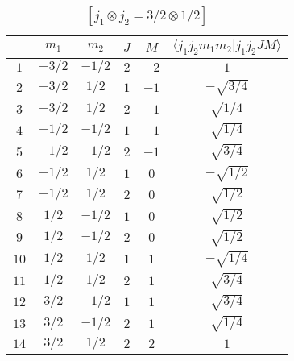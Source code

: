 \begin{table}
\tiny
\caption{$[j_1 \otimes j_2 = 3/2 \otimes 1/2]$}
\begin{center}
\begin{tabular}{|c|c|c|c|c|c|}
\hline 
   & $m_1$ & $m_2$ & $J$ & $M$ & $\langle j_1 j_2 m_1 m_2 | j_1 j_2 J M \rangle$ \\ 
\hline 
$1$ & $-3/2$ & $-1/2$ & $2$ & $-2$ & $1$ \\ 
$2$ & $-3/2$ & $1/2$ & $1$ & $-1$ & $-\sqrt{3/4}$ \\ 
$3$ & $-3/2$ & $1/2$ & $2$ & $-1$ & $\sqrt{1/4}$ \\ 
$4$ & $-1/2$ & $-1/2$ & $1$ & $-1$ & $\sqrt{1/4}$ \\ 
$5$ & $-1/2$ & $-1/2$ & $2$ & $-1$ & $\sqrt{3/4}$ \\ 
$6$ & $-1/2$ & $1/2$ & $1$ & $0$ & $-\sqrt{1/2}$ \\ 
$7$ & $-1/2$ & $1/2$ & $2$ & $0$ & $\sqrt{1/2}$ \\ 
$8$ & $1/2$ & $-1/2$ & $1$ & $0$ & $\sqrt{1/2}$ \\ 
$9$ & $1/2$ & $-1/2$ & $2$ & $0$ & $\sqrt{1/2}$ \\ 
$10$ & $1/2$ & $1/2$ & $1$ & $1$ & $-\sqrt{1/4}$ \\ 
$11$ & $1/2$ & $1/2$ & $2$ & $1$ & $\sqrt{3/4}$ \\ 
$12$ & $3/2$ & $-1/2$ & $1$ & $1$ & $\sqrt{3/4}$ \\ 
$13$ & $3/2$ & $-1/2$ & $2$ & $1$ & $\sqrt{1/4}$ \\ 
$14$ & $3/2$ & $1/2$ & $2$ & $2$ & $1$ \\ 
\hline 
\end{tabular}
\end{center}
\end{table}

